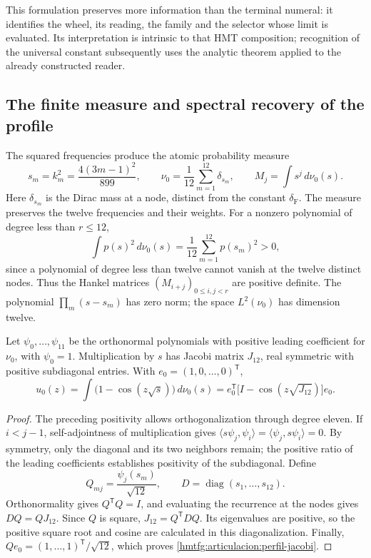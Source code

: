 This formulation preserves more information than the terminal numeral:
it identifies the wheel, its reading, the family and the selector whose limit
is evaluated. Its interpretation is intrinsic to that HMT composition;
recognition of the universal constant subsequently uses the analytic
theorem applied to the already constructed reader.

\subsection{The finite measure and spectral recovery of the profile}
\label{hmtfg:articulacion:jacobi}

The squared frequencies produce the atomic probability measure
\begin{equation}
 s_m=k_m^2=\frac{4(3m-1)^2}{899},\qquad
 \nu_0=\frac1{12}\sum_{m=1}^{12}\delta_{s_m},\qquad
 M_j=\int s^j\,d\nu_0(s).
 \label{hmtfg:articulacion:medida-finita}
\end{equation}
Here \(\delta_{s_m}\) is the Dirac mass at a node, distinct
from the constant \(\delta_{\mathrm F}\). The measure preserves the
twelve frequencies and their weights. For a nonzero polynomial of degree less
than \(r\le12\),
\[
 \int p(s)^2\,d\nu_0(s)
 =\frac1{12}\sum_{m=1}^{12}p(s_m)^2>0,
\]
since a polynomial of degree less than twelve cannot vanish at the
twelve distinct nodes. Thus the Hankel matrices
\((M_{i+j})_{0\le i,j<r}\) are positive definite.
The polynomial \(\prod_m(s-s_m)\) has zero norm; the space
\(L^2(\nu_0)\) has dimension twelve.

\begin{proposition}
\label{hmtfg:articulacion:representacion}
Let \(\psi_0,\ldots,\psi_{11}\) be the orthonormal polynomials
with positive leading coefficient for \(\nu_0\), with
\(\psi_0=1\). Multiplication by \(s\) has Jacobi
matrix \(J_{12}\), real symmetric with positive subdiagonal entries.
With \(e_0=(1,0,\ldots,0)^{\mathsf T}\),
\begin{equation}
 u_0(z)=\int\bigl(1-\cos(z\sqrt{s})\bigr)\,d\nu_0(s)
 =e_0^{\mathsf T}\bigl[I-\cos(z\sqrt{J_{12}})\bigr]e_0.
 \label{hmtfg:articulacion:perfil-jacobi}
\end{equation}
\end{proposition}
\begin{proof}
The preceding positivity allows orthogonalization through degree eleven.
If \(i<j-1\), self-adjointness of multiplication gives
\(\langle s\psi_j,\psi_i\rangle
=\langle\psi_j,s\psi_i\rangle=0\).
By symmetry, only the diagonal and its two neighbors remain; the positive
ratio of the leading coefficients establishes positivity of the
subdiagonal. Define
\[
 Q_{mj}=\frac{\psi_j(s_m)}{\sqrt{12}},\qquad
 D=\operatorname{diag}(s_1,\ldots,s_{12}).
\]
Orthonormality gives \(Q^{\mathsf T}Q=I\), and evaluating the
recurrence at the nodes gives \(DQ=QJ_{12}\). Since \(Q\) is
square, \(J_{12}=Q^{\mathsf T}DQ\). Its eigenvalues are
positive, so the positive square root and cosine are calculated in
this diagonalization. Finally,
\(Qe_0=(1,\ldots,1)^{\mathsf T}/\sqrt{12}\), which proves
\eqref{hmtfg:articulacion:perfil-jacobi}.
\end{proof}

